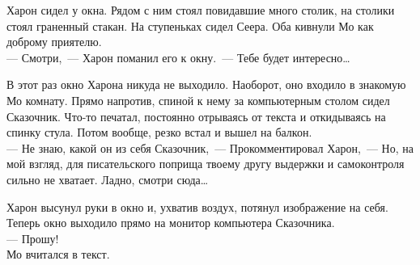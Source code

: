 Харон сидел у окна. Рядом с ним стоял повидавшие много столик, на столики стоял 
граненный стакан. На ступеньках сидел Сеера. Оба кивнули Мо как доброму 
приятелю.\\
--- Смотри,~--- Харон поманил его к окну.~--- Тебе будет 
интересно\ldots

В этот раз окно Харона никуда не выходило. Наоборот, оно входило в знакомую Мо 
комнату. Прямо напротив, спиной к нему за компьютерным столом сидел Сказочник. 
Что-то печатал, постоянно отрываясь от текста и откидываясь на спинку стула. 
Потом вообще, резко встал и вышел на балкон.\\
--- Не знаю, какой он из себя Сказочник,~--- Прокомментировал Харон,~--- Но, на 
мой взгляд, для писательского поприща твоему другу выдержки и самоконтроля сильно 
не хватает. Ладно, смотри сюда\ldots

Харон высунул руки в окно и, ухватив воздух, потянул изображение на себя. 
Теперь окно выходило прямо на монитор компьютера Сказочника. \\
--- Прошу!\\
Мо вчитался в текст.


